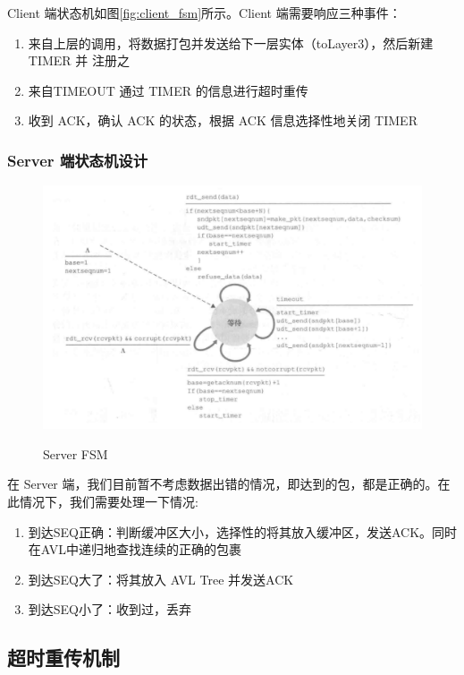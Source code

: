 Client 端状态机如图\ref{fig:client_fsm}所示。Client 端需要响应三种事件：

\begin{enumerate}
    \item 来自上层的调用，将数据打包并发送给下一层实体（toLayer3），然后新建 TIMER 并 注册之
    \item 来自TIMEOUT 通过 TIMER 的信息进行超时重传
    \item 收到 ACK，确认 ACK 的状态，根据 ACK 信息选择性地关闭 TIMER 
\end{enumerate}

\subsubsection*{Server 端状态机设计}

\begin{figure}[!htbp]
    \centering
    \includegraphics[width=1.0\textwidth]{figures/SERVER_FSM.png}
    \label{fig:server_fsm}\caption{Server FSM}
  \end{figure}

在 Server 端，我们目前暂不考虑数据出错的情况，即达到的包，都是正确的。在此情况下，我们需要处理一下情况:

\begin{enumerate}
    \item 到达SEQ正确：判断缓冲区大小，选择性的将其放入缓冲区，发送ACK。同时在AVL中递归地查找连续的正确的包裹
    \item 到达SEQ大了：将其放入 AVL Tree 并发送ACK
    \item 到达SEQ小了：收到过，丢弃
\end{enumerate}

\subsection{超时重传机制}

